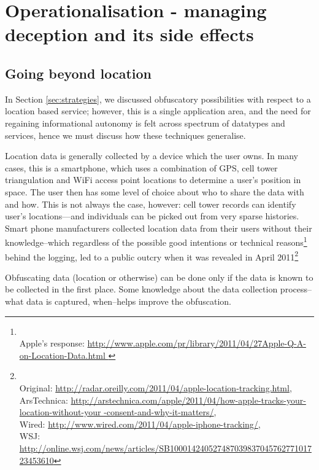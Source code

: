 \documentclass{IOS-Book-Article}     %
\newcommand{\tbox}[3][red]{{
\color{#1}\noindent{
   \fbox{\scriptsize{ {\bf #2} \textsl{#3}}}
   \vspace{2pt}
}
}}
\newcommand{\todo}[1]{\tbox{TODO:}{#1}}
\begin{document}
\section{Operationalisation - managing deception and its side effects}

\subsection{Going beyond location}

In Section \ref{sec:strategies}, we discussed obfuscatory possibilities with
respect to a location based service; however, this is a single application area,
and the need for regaining informational autonomy is felt across spectrum of
datatypes and services, hence we must discuss how these techniques generalise.

Location data is generally collected by a device which the user owns. In many
cases, this is a smartphone, which uses a combination of GPS, cell tower
triangulation and WiFi access point locations to determine a user's position in
space. The user then has some level of choice about who to share the data with
and how. This is not always the case, however: cell tower records can identify
user's locations---and individuals can be picked out from very sparse
histories\cite{montjoye2013Unique}. Smart phone manufacturers collected 
location data from their users without their knowledge--which regardless of the 
possible good intentions or technical reasons\footnote{\\Apple's response: 
\url{http://www.apple.com/pr/library/2011/04/27Apple-Q-A-on-Location-Data.html 
}} behind the logging, led to a public outcry when it was revealed in April 
2011\footnote{\todo{pick one}\\Original: 
\url{http://radar.oreilly.com/2011/04/apple-location-tracking.html},
\\ArsTechnica: \url{ 
http://arstechnica.com/apple/2011/04/how-apple-tracks-your-location-without-your 
-consent-and-why-it-matters/}, \\Wired: 
\url{http://www.wired.com/2011/04/apple-iphone-tracking/}, \\WSJ: \url{ 
http://online.wsj.com/news/articles/SB10001424052748703983704576277101723453610} 
}

Obfuscating data (location or otherwise) can be done only if the data is 
known to be collected in the first place. Some knowledge about the data 
collection process--what data is captured, when--helps improve the obfuscation. 
\end{document}
